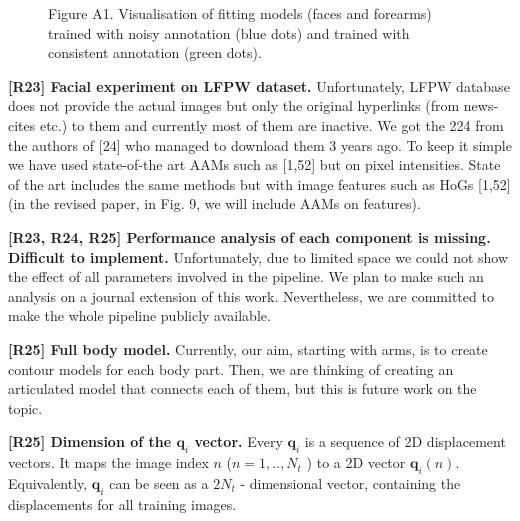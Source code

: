 \documentclass[10pt,twocolumn,letterpaper]{article}
\begin{document}
\begin{figure}[t!]
    \caption*{Figure A1. Visualisation of fitting models (faces and forearms) trained with noisy annotation (blue dots) and trained with consistent annotation (green dots).}
    \label{fig:noise_fitting}
    \vspace{-14pt}
\end{figure}


\textbf{[R23] Facial experiment on LFPW dataset.}
Unfortunately, LFPW database does not provide the actual images but only the original hyperlinks (from news-cites etc.) to them and currently most of them are inactive. We got the 224 from the authors of [24] who managed to download them 3 years ago. To keep it simple we have used state-of-the art AAMs such as [1,52] but on pixel intensities. State of the art includes the same methods but with image features such as HoGs [1,52] (in the revised paper, in Fig. 9, we will include AAMs on features).   

\textbf{[R23, R24, R25] Performance analysis of each component is missing. Difficult to implement.} 
Unfortunately, due to limited space we could not show the effect of all parameters involved in the pipeline. We plan to make such an analysis on a journal extension of this work. Nevertheless, we are committed to make the whole pipeline publicly available. 


\textbf{[R25] Full body model.} Currently, our aim, starting with arms, is to create contour models for each body part. Then, we are thinking of creating an articulated model that connects each of them, but this is future work on the topic. 

\textbf{[R25] Dimension of the $\mathbf{q}_i$ vector.} 
Every $\mathbf{q}_i$ is a sequence of 2D displacement vectors. It maps the image index $n$ ($n=1,..,N_t$ ) to a 2D vector 
$\mathbf{q}_i(n)$.  
Equivalently, $\mathbf{q}_i$ can be seen as a $2 N_t$ - dimensional vector, containing the displacements for all training images. 




\end{document}
